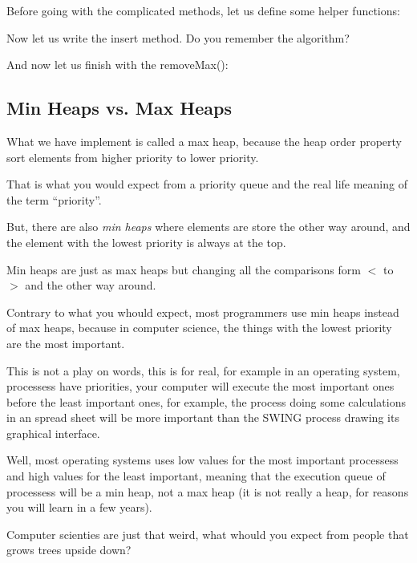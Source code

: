 \documentclass[a4paper, 9pt]{extarticle}
\begin{document}
Before going with the complicated methods, let us define some helper functions:


Now let us write the insert method. Do you remember the algorithm?


And now let us finish with the removeMax():



\subsection{Min Heaps vs. Max Heaps}

What we have implement is called a max heap, because the heap order property
sort elements from higher priority to lower priority.

That is what you would expect from a priority queue and the real life meaning
of the term ``priority''.

But, there are also \emph{min heaps} where elements are store the other way
around, and the element with the lowest priority is always at the top.

Min heaps are just as max heaps but changing all the comparisons form $<$ to
$>$ and the other way around.

Contrary to what you whould expect, most programmers use min heaps instead of
max heaps, because in computer science, the things with the lowest priority are
the most important.

This is not a play on words, this is for real, for example in an operating
system, processess have priorities, your computer will execute the most
important ones before the least important ones, for example, the process doing
some calculations in an spread sheet will be more important than the SWING
process drawing its graphical interface.

Well, most operating systems uses low values for the most important processess
and high values for the least important, meaning that the execution queue of
processess will be a min heap, not a max heap (it is not really a heap, for
reasons you will learn in a few years).

Computer scienties are just that weird, what whould you expect from people that
grows trees upside down?
\end{document}
